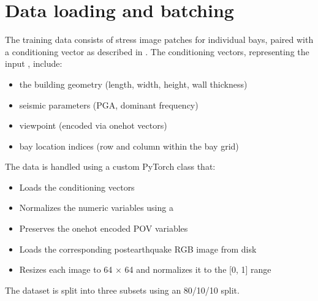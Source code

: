 \documentclass[letterpaper,10pt,english]{sphinxmanual}
\begin{document}
\section{Data loading and batching}
\label{\detokenize{model:data-loading-and-batching}}
\sphinxAtStartPar
The training data consists of stress image patches for individual bays, paired
with a conditioning vector as described in {\hyperref[\detokenize{data:data-section}]{}}.
The conditioning vectors, representing the input , include:
\begin{itemize}
\item {} 
\sphinxAtStartPar
the building geometry (length, width, height, wall thickness)

\item {} 
\sphinxAtStartPar
seismic parameters (PGA, dominant frequency)

\item {} 
\sphinxAtStartPar
viewpoint (encoded via one\sphinxhyphen{}hot vectors)

\item {} 
\sphinxAtStartPar
bay location indices (row and column within the bay grid)

\end{itemize}

\sphinxAtStartPar
The data is handled using a custom PyTorch  class that:
\begin{itemize}
\item {} 
\sphinxAtStartPar
Loads the conditioning vectors

\item {} 
\sphinxAtStartPar
Normalizes the numeric variables using a 

\item {} 
\sphinxAtStartPar
Preserves the one\sphinxhyphen{}hot encoded POV variables

\item {} 
\sphinxAtStartPar
Loads the corresponding post\sphinxhyphen{}earthquake RGB image from disk

\item {} 
\sphinxAtStartPar
Resizes each image to 64 × 64 and normalizes it to the {[}0, 1{]} range

\end{itemize}

\sphinxAtStartPar
The dataset is split into three subsets using an 80/10/10 split.
\end{document}
